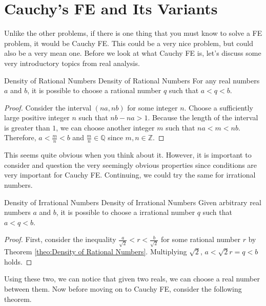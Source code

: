 \documentclass[../../../main.tex]{subfiles}
\begin{document}
\section{Cauchy's FE and Its Variants}

Unlike the other problems, if there is one thing that you must
know to solve a FE problem, it would be Cauchy FE. This could
be a very nice problem, but could also be a very mean one.
Before we look at what Cauchy FE is, let's discuss some very
introductory topics from real analysis.

\begin{theorem}
{Density of Rational Numbers}
{Density of Rational Numbers}
For any real numbers $a$ and $b$, it is possible to choose
a rational number $q$ such that $a < q < b$.
\end{theorem}
\begin{proof}
Consider the interval $(na, nb)$ for some integer $n$. Choose a
sufficiently large positive integer $n$ such that $nb - na > 1$.
Because the length of the interval is greater than $1$, we can
choose another integer $m$ such that $na < m < nb$. Therefore,
$a < \frac{m}{n} < b$ and $\frac{m}{n} \in \mathbb{Q}$ since
$m, n \in \mathbb{Z}$.
\end{proof}

This seems quite obvious when you think about it. However,
it is important to consider and question the very seemingly obvious
properties since conditions are very important for Cauchy FE.
Continuing, we could try the same for irrational numbers.

\begin{theorem}
{Density of Irrational Numbers}
{Density of Irrational Numbers}
Given arbitrary real numbers $a$ and $b$, it is possible
to choose a irrational number $q$ such that $a < q < b$.
\end{theorem}
\begin{proof}
First, consider the inequality $\frac{a}{\sqrt{2}} < r <
\frac{b}{\sqrt{2}}$ for some rational number $r$ by Theorem
\ref{theo:Density of Rational Numbers}. Multiplying
$\sqrt{2}$, $a < \sqrt{2} r = q < b$ holds.
\end{proof}

Using these two, we can notice that given two reals, we can
choose a real number between them. Now before moving on to
Cauchy FE, consider the following theorem.
\end{document}
